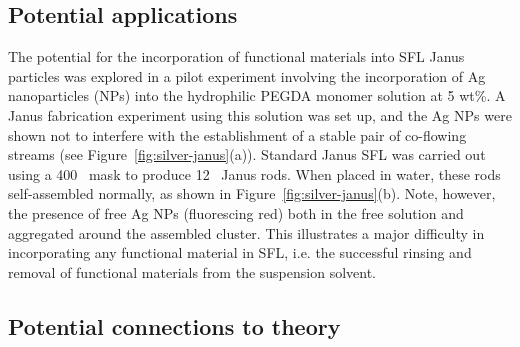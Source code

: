 \subsection{Potential applications}


The potential for the incorporation of functional materials into SFL Janus particles was 
explored in a pilot experiment involving the incorporation of Ag nanoparticles (NPs) into the
hydrophilic PEGDA monomer solution at 5 wt\%. A Janus fabrication experiment using this 
solution was set up, and the Ag NPs were shown not to interfere with the establishment of a stable
pair of co-flowing streams (see Figure~\ref{fig:silver-janus}(a)). Standard Janus SFL was carried
out using a 400 \microns~mask to produce 12 \microns~Janus rods. When placed in water, these rods
self-assembled normally, as shown in Figure~\ref{fig:silver-janus}(b).  Note, however, the presence of
free Ag NPs (fluorescing red) both in the free solution and aggregated around the assembled cluster.
This illustrates a major difficulty in incorporating any functional material in SFL, i.e. the successful 
rinsing and removal of functional materials from the suspension solvent.

\subsection{Potential connections to theory}

